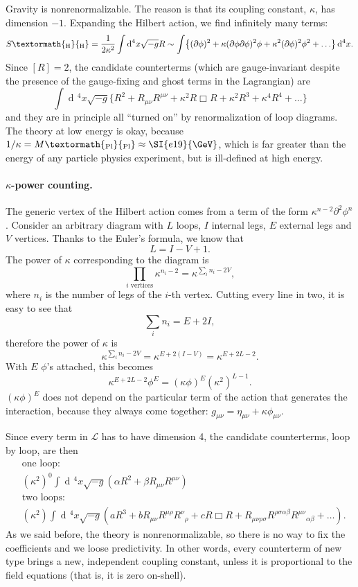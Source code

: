 \documentclass[a4paper,12pt]{book}
\newcommand{\ped}[1]{\textormath{\textsubscript{#1}}{_{\mathrm{#1}}}}
\newcommand{\dd}{\mathop{\mathrm{d}\!}{}}
\theoremstyle{definition}
\theoremstyle{remark}
\begin{document}
Gravity is nonrenormalizable. The reason is that its coupling constant, $\kappa$, has dimension $-1$. Expanding the Hilbert action, we find infinitely many terms:
\[S\ped{H}=\frac1{2\kappa^2}\int\dd^4x\sqrt{-g}R\sim\int\bigl\{(\partial\phi)^2+\kappa(\partial\phi\partial\phi)^2\phi+\kappa^2(\partial\phi)^2\phi^2+\ldots\bigr\}\dd^4x.\]
Since $[R]=2$, the candidate counterterms (which are gauge-invariant despite the presence of the gauge-fixing and ghost terms in the Lagrangian) are
\[\int\dd^4x\sqrt{-g}\bigl\{R^2+R_{\mu\nu}R^{\mu\nu}+\kappa^2R\Box R+\kappa^2R^3+\kappa^4R^4+\ldots\bigr\}\]
and they are in principle all ``turned on'' by renormalization of loop diagrams. The theory at low energy is okay, because $1/\kappa=M\ped{Pl}\approx\SI{e19}{\GeV}$, which is far greater than the energy of any particle physics experiment, but is ill-defined at high energy.

\paragraph{$\kappa$-power counting.}
The generic vertex of the Hilbert action comes from a term of the form $\kappa^{n-2}\partial^2\phi^n$. Consider an arbitrary diagram with $L$ loops, $I$ internal legs, $E$ external legs and $V$ vertices. Thanks to the Euler's formula, we know that
\[L=I-V+1.\]
The power of $\kappa$ corresponding to the diagram is
\[\prod_{i\text{ vertices}}\kappa^{n_i-2}=\kappa^{\sum_in_i-2V},\]
where $n_i$ is the number of legs of the $i$-th vertex. Cutting every line in two, it is easy to see that
\[\sum_in_i=E+2I,\]
therefore the power of $\kappa$ is
\[\kappa^{\sum_in_i-2V}=\kappa^{E+2(I-V)}=\kappa^{E+2L-2}.\]
With $E$ $\phi$'s attached, this becomes
\[\kappa^{E+2L-2}\phi^E=(\kappa\phi)^E(\kappa^2)^{L-1}.\]
$(\kappa\phi)^E$ does not depend on the particular term of the action that generates the interaction, because they always come together: $g_{\mu\nu}=\eta_{\mu\nu}+\kappa\phi_{\mu\nu}$.

Since every term in $\mathcal L$ has to have dimension 4, the candidate counterterms, loop by loop, are then
\begin{align*}
&\text{one loop: }\\
&(\kappa^2)^0\int\dd^4x\sqrt{-g}(\alpha R^2+\beta R_{\mu\nu}R^{\mu\nu})\\
&\text{two loops: }\\
&(\kappa^2)\int\dd^4x\sqrt{-g}(a R^3+b R_{\mu\nu}R^{\mu\rho}R^\nu{}_\rho+cR\Box R+R_{\mu\nu\rho\sigma}R^{\rho\sigma\alpha\beta}R^{\mu\nu}{}_{\alpha\beta}+\ldots).
\end{align*}
As we said before, the theory is nonrenormalizable, so there is no way to fix the coefficients and we loose predictivity. In other words, every counterterm of new type brings a new, independent coupling constant, unless it is proportional to the field equations (that is, it is zero on-shell).
\end{document}
